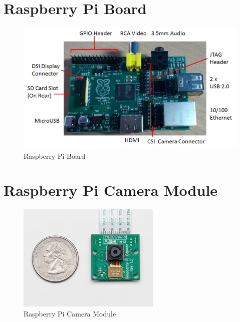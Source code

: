 \documentclass[12pt, a4paper]{article}
\begin{document}
\section{Raspberry Pi Board}
\begin{figure}[htp]
\centering
\includegraphics[scale=1.00]{RPiModelB.png}
\caption{Raspberry Pi Board}
\label{}
\end{figure}

\newpage
\section{Raspberry Pi Camera Module}
\begin{figure}[htp]
\centering
\includegraphics[scale=1.00]{index.jpeg}
\caption{Raspberry Pi Camera Module}
\label{}
\end{figure}
\newpage
\end{document}
